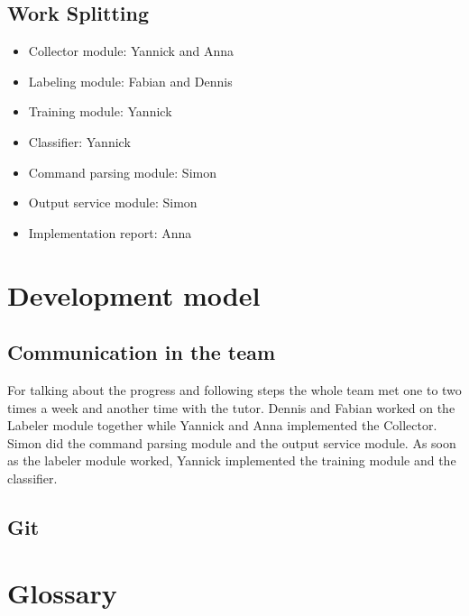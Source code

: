 \documentclass[parskip=full]{scrartcl}
\begin{document}
\subsection{Work Splitting}
\begin{itemize}

\item Collector module: Yannick and Anna

\item Labeling module: Fabian and Dennis

\item Training module: Yannick

\item Classifier: Yannick

\item Command parsing module: Simon

\item Output service module: Simon

\item Implementation report: Anna

\end{itemize}

\section{Development model}
\subsection{Communication in the team}
For talking about the progress and following steps the whole team met one to two times a week and another time with the tutor.
Dennis and Fabian worked on the Labeler module together while Yannick and Anna implemented the Collector.
Simon did the command parsing module and the output service module.
As soon as the labeler module worked, Yannick implemented the training module and the classifier.
\subsection{Git}



\newpage
\section{Glossary}

%
\printnoidxglossaries
\end{document}
